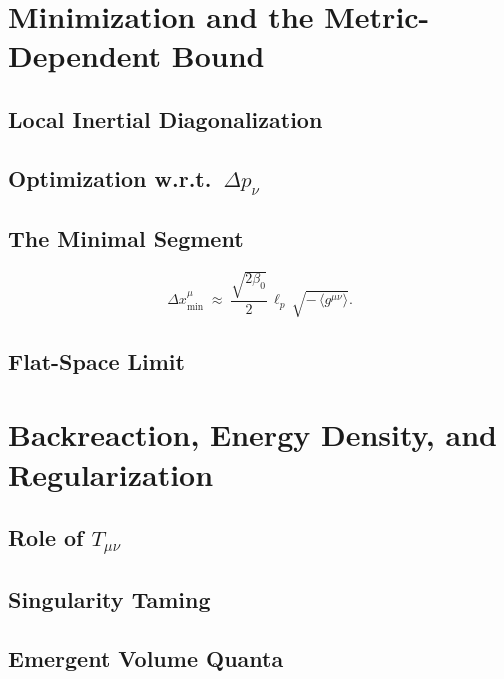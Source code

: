 \documentclass[11pt,oneside]{book}
\numberwithin{equation}{chapter}
\newcommand{\lp}{\ell_p}             %
\newcommand{\betaz}{\beta_0}
\begin{document}
\chapter{Minimization and the Metric-Dependent Bound}
\section{Local Inertial Diagonalization}
\section{Optimization w.r.t.\ \texorpdfstring{$\Delta p_\nu$}{Delta p}}
\section{The Minimal Segment}
\begin{equation}
\Delta x_{\min}^{\mu} \;\approx\; 
\frac{\sqrt{2\betaz}}{2}\,\lp\,\sqrt{-\,\langle g^{\mu\nu}\rangle}.
\label{eq:minlength}
\end{equation}
\section{Flat-Space Limit}

\chapter{Backreaction, Energy Density, and Regularization}
\section{Role of \texorpdfstring{$T_{\mu\nu}$}{Tmunu}}
\section{Singularity Taming}
\section{Emergent Volume Quanta}
\end{document}
